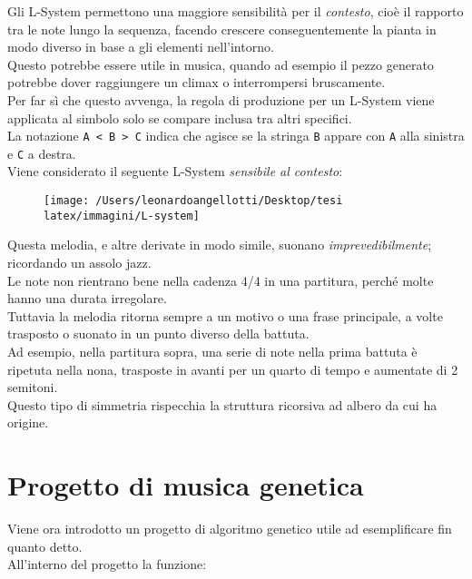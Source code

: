 \documentclass[a4paper,12pt]{report}
\begin{document}
Gli L-System permettono una maggiore sensibilità per il \textit{contesto}, cioè il rapporto tra le note lungo la sequenza, 
facendo crescere conseguentemente la pianta in modo diverso in base a gli elementi nell'intorno. \\
Questo potrebbe essere utile in musica, quando ad esempio il pezzo generato potrebbe dover raggiungere un climax o interrompersi bruscamente. \\
Per far sì che questo avvenga, la regola di produzione per un L-System viene applicata al simbolo solo se compare inclusa tra altri specifici. \\
La notazione \texttt{A < B > C} indica che agisce se la stringa \texttt{B} appare con \texttt{A} alla sinistra e \texttt{C} a destra. \\
Viene considerato il seguente L-System \textit{sensibile al contesto}: 

\begin{figure}[H]
    \centering
    \texttt{[image: /Users/leonardoangellotti/Desktop/tesi latex/immagini/L-system]} 
    \label{fig:immagine8}
\end{figure}

Questa melodia, e altre derivate in modo simile, suonano \textit{imprevedibilmente}; ricordando un assolo jazz. \\
Le note non rientrano bene nella cadenza 4/4 in una partitura, perché molte hanno una durata irregolare. \\
Tuttavia la melodia ritorna sempre a un motivo o una frase principale, a volte trasposto o suonato in un punto diverso della battuta. \\
Ad esempio, nella partitura sopra, una serie di note nella prima battuta è ripetuta nella nona, trasposte in avanti per un quarto di tempo e aumentate di 2 semitoni. \\
Questo tipo di simmetria rispecchia la struttura ricorsiva ad albero da cui ha origine. 

\chapter{Progetto di musica genetica}

Viene ora introdotto un progetto di algoritmo genetico utile ad esemplificare fin quanto detto. \\
All'interno del progetto la funzione: \\
\end{document}
